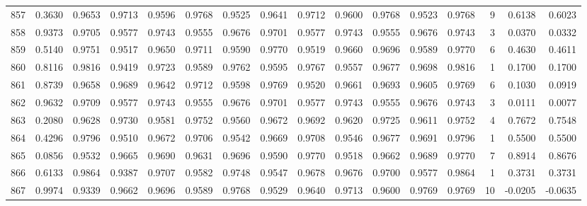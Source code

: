 \begin{tabular}{lrrrrrrrrrrrrrrr}
857 &      0.3630 &  0.9653 &  0.9713 &  0.9596 &  0.9768 &  0.9525 &  0.9641 &  0.9712 &  0.9600 &  0.9768 &   0.9523 &     0.9768 &      9 &                    0.6138 &                     0.6023 \\
858 &      0.9373 &  0.9705 &  0.9577 &  0.9743 &  0.9555 &  0.9676 &  0.9701 &  0.9577 &  0.9743 &  0.9555 &   0.9676 &     0.9743 &      3 &                    0.0370 &                     0.0332 \\
859 &      0.5140 &  0.9751 &  0.9517 &  0.9650 &  0.9711 &  0.9590 &  0.9770 &  0.9519 &  0.9660 &  0.9696 &   0.9589 &     0.9770 &      6 &                    0.4630 &                     0.4611 \\
860 &      0.8116 &  0.9816 &  0.9419 &  0.9723 &  0.9589 &  0.9762 &  0.9595 &  0.9767 &  0.9557 &  0.9677 &   0.9698 &     0.9816 &      1 &                    0.1700 &                     0.1700 \\
861 &      0.8739 &  0.9658 &  0.9689 &  0.9642 &  0.9712 &  0.9598 &  0.9769 &  0.9520 &  0.9661 &  0.9693 &   0.9605 &     0.9769 &      6 &                    0.1030 &                     0.0919 \\
862 &      0.9632 &  0.9709 &  0.9577 &  0.9743 &  0.9555 &  0.9676 &  0.9701 &  0.9577 &  0.9743 &  0.9555 &   0.9676 &     0.9743 &      3 &                    0.0111 &                     0.0077 \\
863 &      0.2080 &  0.9628 &  0.9730 &  0.9581 &  0.9752 &  0.9560 &  0.9672 &  0.9692 &  0.9620 &  0.9725 &   0.9611 &     0.9752 &      4 &                    0.7672 &                     0.7548 \\
864 &      0.4296 &  0.9796 &  0.9510 &  0.9672 &  0.9706 &  0.9542 &  0.9669 &  0.9708 &  0.9546 &  0.9677 &   0.9691 &     0.9796 &      1 &                    0.5500 &                     0.5500 \\
865 &      0.0856 &  0.9532 &  0.9665 &  0.9690 &  0.9631 &  0.9696 &  0.9590 &  0.9770 &  0.9518 &  0.9662 &   0.9689 &     0.9770 &      7 &                    0.8914 &                     0.8676 \\
866 &      0.6133 &  0.9864 &  0.9387 &  0.9707 &  0.9582 &  0.9748 &  0.9547 &  0.9678 &  0.9676 &  0.9700 &   0.9577 &     0.9864 &      1 &                    0.3731 &                     0.3731 \\
867 &      0.9974 &  0.9339 &  0.9662 &  0.9696 &  0.9589 &  0.9768 &  0.9529 &  0.9640 &  0.9713 &  0.9600 &   0.9769 &     0.9769 &     10 &                   -0.0205 &                    -0.0635 \\

\end{tabular}
